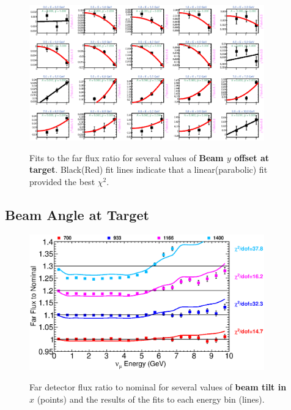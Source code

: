 \begin{figure}[hb]
  \begin{center}
    {\includegraphics[width=4.0in]{figures/NominalY_far_fits.eps}}
  \end{center}
\caption{ Fits to the far flux ratio for several values of {\bf Beam $y$ offset at target}. Black(Red) fit lines indicate that a linear(parabolic) fit provided the best $\chi^2$. }
\end{figure}

\clearpage
\subsection{Beam Angle at Target}

\begin{figure}[ht]
  \begin{center}
    {\includegraphics[width=4.0in]{figures/Tilt_t_far_summary.eps}}
  \end{center}
\caption{ Far detector flux ratio to nominal for several values of {\bf beam tilt in $x$} (points) and the results of the fits to each energy bin (lines).}
\end{figure}

